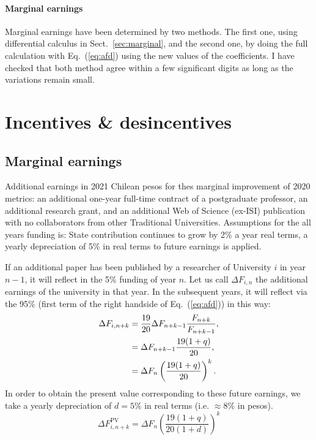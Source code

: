\documentclass[twocolumn]{article}
\def\eqref#1{Eq.~(\ref{eq:#1})}
\begin{document}
\paragraph{Marginal earnings}  Marginal earnings have been determined by two methods.  The first one, using differential calculus in Sect.~\ref{sec:marginal}, and the second one, by doing the full calculation with \eqref{afd} using the new values of the coefficients.  I have checked that both method agree within a few significant digits as long as the variations remain small.

\section{Incentives \& desincentives}
\subsection{Marginal earnings}
\label{tab:sciencecost}
\begin{table}[t]
\centering
\caption{Additional earnings in 2021 Chilean pesos for thes marginal improvement of 2020 metrics: an additional one-year full-time contract of a postgraduate professor, an additional research grant, and an additional Web of Science (ex-ISI) publication with no collaborators from other Traditional Universities.  Assumptions for the all years funding is: State contribution continues to grow by 2\% a year real terms, a yearly depreciation of 5\% in real terms to future earnings is applied.}
\setlength\tabcolsep{5pt}
\vskip 5pt

\end{table}

If an additional paper has been published by a researcher of University $i$ in year $n - 1$, it will reflect in the 5\% funding of year $n$. Let us call $\Delta F_{i,n}$ the additional earnings 
of the university in that year.  In the subsequent years, it will reflect via the 95\% 
(first term of the right handside of \eqref{afd}) in this way:
\begin{align}
   \Delta F_{i,n+k} &=  \frac{19}{20} \Delta F_{n+k-1} 
                                \frac{F_{n+k}}{F_{n+k-1}}, \notag\\
                    &= \Delta F_{n+k-1}  \frac{ 19 (1 + q)} { 20}\notag,\\
                    &= \Delta F_{n} \left(\frac{ 19(1+q)} {20} \right) ^{k}.
\end{align}
In order to obtain the present value  corresponding to these future earnings, we take a yearly depreciation of $d = 5$\% in real terms (i.e. $\approx 8\%$ in pesos).  
\begin{equation}
    \Delta F_{i,n+k}^\text{PV} = \Delta F_{n}    
                \left(\frac{ 19(1+q)} {20(1+d)} \right) ^{k}
\end{equation}
\end{document}
